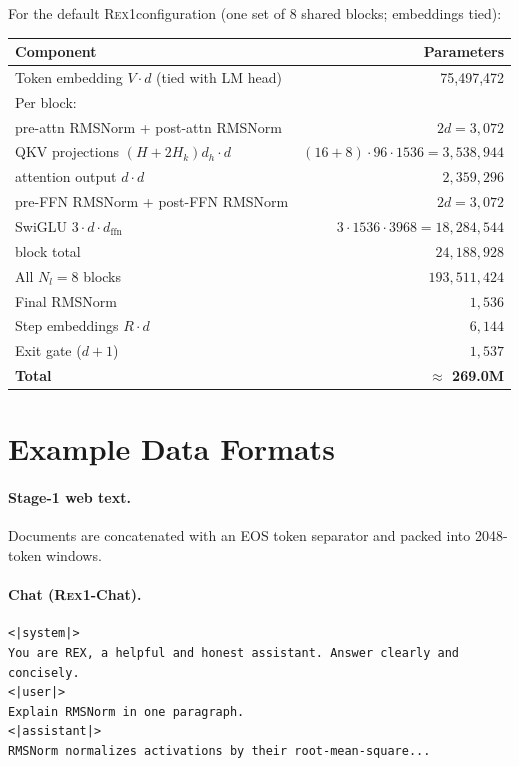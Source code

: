 \documentclass[11pt,a4paper]{article}
\newcommand{\REX}{\textsc{Rex1}\xspace}
\providecommand{\xspace}{}
\begin{document}
For the default \REX configuration (one set of 8 shared blocks; embeddings
tied):

\begin{table}[h]
  \centering
  \footnotesize
  \begin{tabular}{lr}
    \toprule
    Component & Parameters \\
    \midrule
    Token embedding $V \cdot d$ (tied with LM head) & 75{,}497{,}472 \\
    Per block: \\
    \quad pre-attn RMSNorm + post-attn RMSNorm & $2d = 3{,}072$ \\
    \quad QKV projections $(H + 2 H_k) d_h \cdot d$ & $(16 + 8) \cdot 96 \cdot 1536 = 3{,}538{,}944$ \\
    \quad attention output $d \cdot d$ & $2{,}359{,}296$ \\
    \quad pre-FFN RMSNorm + post-FFN RMSNorm & $2d = 3{,}072$ \\
    \quad SwiGLU $3 \cdot d \cdot d_{\mathrm{ffn}}$ & $3 \cdot 1536 \cdot 3968 = 18{,}284{,}544$ \\
    \quad block total & $24{,}188{,}928$ \\
    All $N_l = 8$ blocks & $193{,}511{,}424$ \\
    Final RMSNorm & $1{,}536$ \\
    Step embeddings $R \cdot d$ & $6{,}144$ \\
    Exit gate ($d + 1$) & $1{,}537$ \\
    \midrule
    \textbf{Total} & \textbf{$\approx$ 269.0M} \\
    \bottomrule
  \end{tabular}
\end{table}

\section{Example Data Formats}

\paragraph{Stage-1 web text.}
Documents are concatenated with an EOS token separator and packed into 2048-token windows.

\paragraph{Chat (\REX-Chat).}
\begin{lstlisting}
<|system|>
You are REX, a helpful and honest assistant. Answer clearly and concisely.
<|user|>
Explain RMSNorm in one paragraph.
<|assistant|>
RMSNorm normalizes activations by their root-mean-square...
\end{lstlisting}
\end{document}
